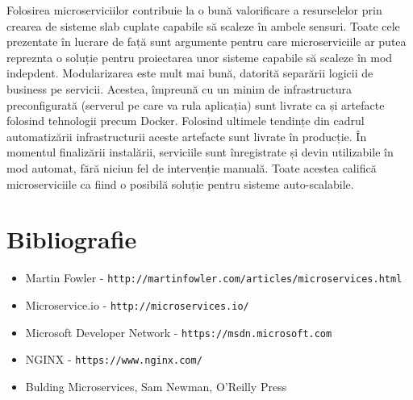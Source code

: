 \documentclass[12pt, a4paper, oneside, romanian]{teza-upb}
\begin{document}
Folosirea microserviciilor contribuie la o bună valorificare a resurselelor prin crearea de sisteme slab cuplate capabile să scaleze în ambele sensuri. Toate cele prezentate în lucrare de față sunt argumente pentru care microserviciile ar putea repreznta o soluție pentru proiectarea unor sisteme capabile să scaleze în mod indepdent. Modularizarea este mult mai bună, datorită separării logicii de business pe servicii. Acestea, împreună cu un minim de infrastructura preconfigurată (serverul pe care va rula aplicația) sunt livrate ca și artefacte folosind tehnologii precum Docker. Folosind ultimele tendințe din cadrul automatizării infrastructurii aceste artefacte sunt livrate în producție. În momentul finalizării instalării, serviciile sunt înregistrate și devin utilizabile în mod automat, fără niciun fel de intervenție manuală. Toate acestea califică microserviciile ca fiind o posibilă soluție pentru sisteme auto-scalabile.

\chapter{Bibliografie}

\begin{itemize}
 \item Martin Fowler - \texttt{http://martinfowler.com/articles/microservices.html}
 \item Microservice.io - \texttt{http://microservices.io/}
 \item Microsoft Developer Network - \texttt{https://msdn.microsoft.com}
 \item NGINX - \texttt{https://www.nginx.com/}
 \item Bulding Microservices, Sam Newman, O'Reilly Press
\end{itemize}
\end{document}
